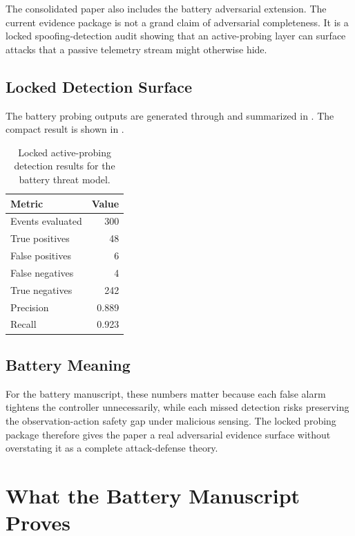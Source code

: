The consolidated paper also includes the battery adversarial extension.  The
current evidence package is not a grand claim of adversarial completeness.  It
is a locked spoofing-detection audit showing that an active-probing layer can
surface attacks that a passive telemetry stream might otherwise hide.

\subsection{Locked Detection Surface}

The battery probing outputs are generated through
 and summarized in
.  The compact result is
shown in .

\begin{table}[htbp]
\centering\small
\caption{Locked active-probing detection results for the battery threat model.}
\label{tab:probing_compact}
\begin{tabular}{lr}
\toprule
Metric & Value \\
\midrule
Events evaluated & 300 \\
True positives & 48 \\
False positives & 6 \\
False negatives & 4 \\
True negatives & 242 \\
Precision & 0.889 \\
Recall & 0.923 \\
\bottomrule
\end{tabular}
\end{table}

\subsection{Battery Meaning}

For the battery manuscript, these numbers matter because each false alarm
tightens the controller unnecessarily, while each missed detection risks
preserving the observation-action safety gap under malicious sensing.  The
locked probing package therefore gives the paper a real adversarial evidence
surface without overstating it as a complete attack-defense theory.

\section{What the Battery Manuscript Proves}\label{sec:battery_scope}

